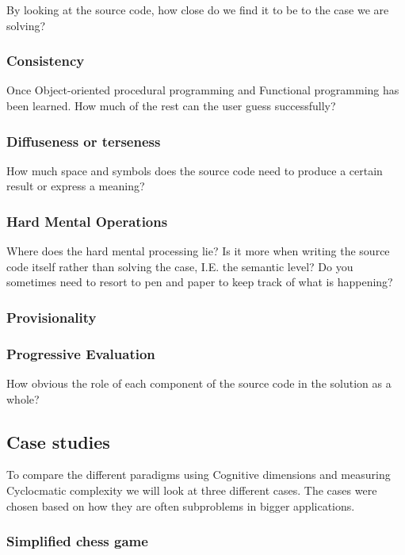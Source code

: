 \documentclass[12pt]{article}
\theoremstyle{definition}
\theoremstyle{theorem}
\begin{document}
By looking at the source code, how close do we find it to be to the case
we are solving?

\subsubsection{Consistency}

Once Object-oriented procedural programming and Functional programming has been
learned. How much of the rest can the user guess successfully? 

\subsubsection{Diffuseness or terseness}

How much space and symbols does the source code need to produce a certain result
or express a meaning?

\subsubsection{Hard Mental Operations}

Where does the hard mental processing lie? Is it more when writing the source
code itself rather than solving the case, I.E. the semantic level? Do you
sometimes need to resort to pen and paper to keep track of what is happening?

\subsubsection{Provisionality}

\subsubsection{Progressive Evaluation}

How obvious the role of each component of the source code in the solution as a
whole?

\subsection{Case studies}

To compare the different paradigms using Cognitive dimensions and measuring
Cyclocmatic complexity we will look at three different cases. The cases were
chosen based on how they are often subproblems in bigger applications.

\subsubsection{Simplified chess game}
\end{document}
